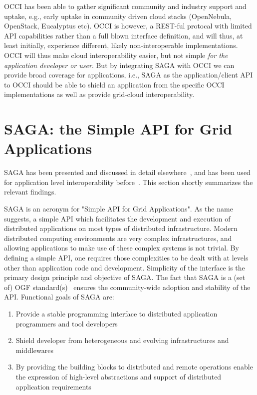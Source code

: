 \documentclass[10pt,conference,final,letterpaper,twoside,twocolumn,]{IEEEtran}
\begin{document}
 OCCI has been able to gather significant community and industry
 support and uptake, e.g., early uptake in community driven cloud
 stacks (OpenNebula, OpenStack, Eucalyptus etc).  OCCI is however, a
 REST-ful protocal with limited API capabilities rather than a full
 blown interface definition, and will thus, at least initially,
 experience different, likely non-interoperable implementations. OCCI
 will thus make cloud interoperability easier, but not simple {\it for
   the application developer or user}.  But by integrating SAGA with
 OCCI we can provide broad coverage for applications, i.e., SAGA as
 the application/client API to OCCI should be able to shield an
 application from the specific OCCI implementations as well as provide
 grid-cloud interoperability.

\section{SAGA: the Simple API for Grid Applications}
\label{sec:saga}

 SAGA has been presented and discussed in detail
 elsewhere~\cite{sagapub...}, and has been used for application level
 interoperability before~\cite{sagainterop...}.  This section shortly
 summarizes the relevant findings.

 SAGA is an acronym for "Simple API for Grid Applications". As the
 name suggests, a simple API which facilitates the development and
 execution of distributed applications on most types of distributed
 infrastructure.  Modern distributed computing environments are very
 complex infrastructures, and allowing applications to make use of
 these complex systems is not trivial.  By defining a simple API, one
 requires those complexities to be dealt with at levels other than
 application code and development.  Simplicity of the interface is the
 primary design principle and objective of SAGA.  The fact that SAGA
 is a (set of) OGF standard(s)~\cite{sagaspecs...} ensures the
 community-wide adoption and stability of the API.  Functional goals
 of SAGA are:

 \begin{enumerate}

  \item Provide a stable programming interface to distributed
  application programmers and tool developers
 
  \item Shield developer from heterogeneous and evolving
  infrastructures and middlewares

  \item By providing the building blocks to distributed and remote
  operations enable the expression of high-level abstractions and
  support of distributed application requirements

 \end{enumerate}
\end{document}
